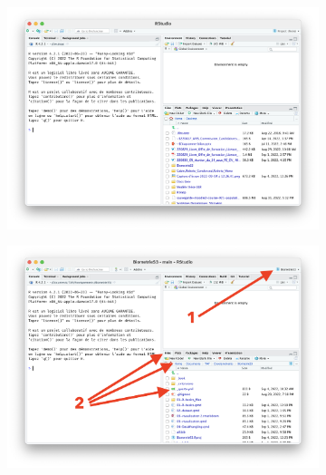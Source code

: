\documentclass[
  a4paper,
  DIV=11,
  numbers=noendperiod,
  oneside]{scrreprt}
\begin{document}
\begin{figure}

\begin{minipage}{0.50\linewidth}

\begin{figure}[H]

{\centering \includegraphics{images/Avant.png}

}


\end{figure}%

\end{minipage}%
%
\begin{minipage}{0.50\linewidth}

\begin{figure}[H]

{\centering \includegraphics{images/Après.png}

}


\end{figure}%

\end{minipage}%

\end{figure}%
\end{document}
